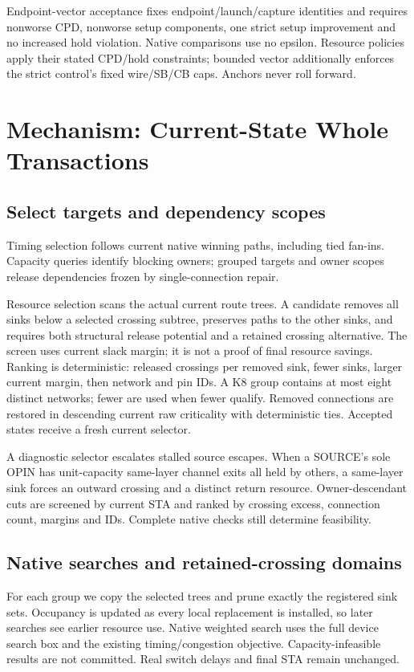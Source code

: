 \documentclass[conference,10pt]{IEEEtran}
\begin{document}
Endpoint-vector acceptance fixes endpoint/launch/capture identities and requires nonworse CPD, nonworse setup components, one strict setup improvement and no increased hold violation. Native comparisons use no epsilon. Resource policies apply their stated CPD/hold constraints; bounded vector additionally enforces the strict control's fixed wire/SB/CB caps. Anchors never roll forward.

\section{Mechanism: Current-State Whole Transactions}
\subsection{Select targets and dependency scopes}
Timing selection follows current native winning paths, including tied fan-ins. Capacity queries identify blocking owners; grouped targets and owner scopes release dependencies frozen by single-connection repair.

Resource selection scans the actual current route trees. A candidate removes all sinks below a selected crossing subtree, preserves paths to the other sinks, and requires both structural release potential and a retained crossing alternative. The screen uses current slack margin; it is not a proof of final resource savings. Ranking is deterministic: released crossings per removed sink, fewer sinks, larger current margin, then network and pin IDs. A K8 group contains at most eight distinct networks; fewer are used when fewer qualify. Removed connections are restored in descending current raw criticality with deterministic ties. Accepted states receive a fresh current selector.

A diagnostic selector escalates stalled source escapes. When a SOURCE's sole OPIN has unit-capacity same-layer channel exits all held by others, a same-layer sink forces an outward crossing and a distinct return resource. Owner-descendant cuts are screened by current STA and ranked by crossing excess, connection count, margins and IDs. Complete native checks still determine feasibility.

\subsection{Native searches and retained-crossing domains}
For each group we copy the selected trees and prune exactly the registered sink sets. Occupancy is updated as every local replacement is installed, so later searches see earlier resource use. Native weighted search uses the full device search box and the existing timing/congestion objective. Capacity-infeasible results are not committed. Real switch delays and final STA remain unchanged.
\end{document}
